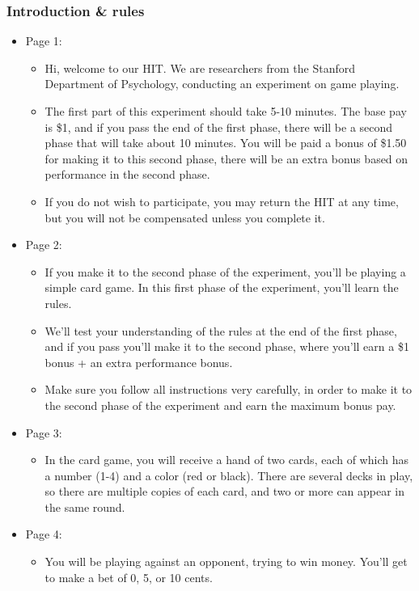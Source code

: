 \subsubsection{Introduction \& rules}
\begin{itemize}
\item Page 1:
    \begin{itemize}
    \item Hi, welcome to our HIT. We are researchers from the Stanford Department of Psychology, conducting an experiment on game playing.
    \item The first part of this experiment should take 5-10 minutes. The base pay is \$1, and if you pass the end of the first phase, there will be a second phase that will take about 10 minutes. You will be paid a bonus of \$1.50 for making it to this second phase, there will be an extra bonus based on performance in the second phase.
    \item If you do not wish to participate, you may return the HIT at any time, but you will not be compensated unless you complete it.
    \end{itemize}
\item  Page 2:
    \begin{itemize}
    \item If you make it to the second phase of the experiment, you'll be playing a simple card game. In this first phase of the experiment, you'll learn the rules.
    \item We'll test your understanding of the rules at the end of the first phase, and if you pass you'll make it to the second phase, where you'll earn a \$1 bonus + an extra performance bonus.
    \item Make sure you follow all instructions very carefully, in order to make it to the second phase of the experiment and earn the maximum bonus pay.
    \end{itemize}
\item  Page 3:
    \begin{itemize}
    \item In the card game, you will receive a hand of two cards, each of which has a number (1-4) and a color (red or black). There are several decks in play, so there are multiple copies of each card, and two or more can appear in the same round.
    \end{itemize}
\item  Page 4:
    \begin{itemize}
    \item You will be playing against an opponent, trying to win money. You'll get to make a bet of 0, 5, or 10 cents.

\end{itemize}
\end{itemize}
